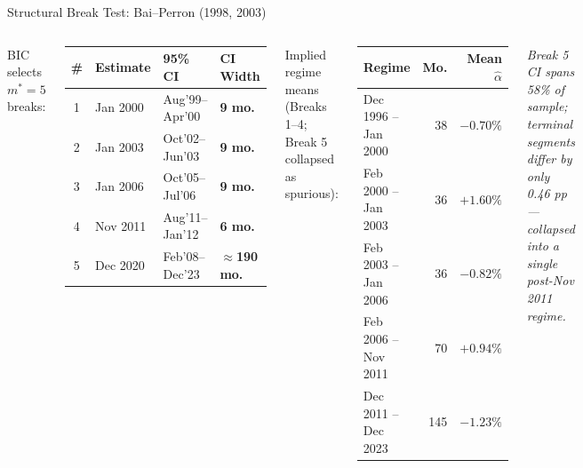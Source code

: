 \documentclass[aspectratio=169,10pt]{beamer}
\newcommand{\red}[1]{\textcolor{AlertRed}{\textbf{#1}}}
\newcommand{\green}[1]{\textcolor{SkillGreen}{\textbf{#1}}}
\begin{document}
\begin{frame}{Structural Break Test: Bai--Perron (1998, 2003)}
\begin{columns}[T]
{\scriptsize BIC selects $m^* = 5$ breaks:}
\vspace{2pt}
\begin{center}
\setlength{\tabcolsep}{3pt}
\scriptsize
\begin{tabular}{clll}
\toprule
\textbf{\#} & \textbf{Estimate} & \textbf{95\% CI} & \textbf{CI Width}\\
\midrule
1 & Jan 2000 & Aug'99–Apr'00 & \green{9 mo.} \\
2 & Jan 2003 & Oct'02–Jun'03 & \green{9 mo.} \\
3 & Jan 2006 & Oct'05–Jul'06 & \green{9 mo.} \\
4 & Nov 2011 & Aug'11–Jan'12 & \green{6 mo.} \\
5 & Dec 2020 & Feb'08–Dec'23 & \red{$\approx$190 mo.} \\
\bottomrule
\end{tabular}
\end{center}
\vspace{3pt}
{\scriptsize Implied regime means (Breaks 1--4; Break 5 collapsed as spurious):}
\vspace{2pt}
\begin{center}
\setlength{\tabcolsep}{3pt}
\scriptsize
\begin{tabular}{lrr}
\toprule
\textbf{Regime} & \textbf{Mo.} & \textbf{Mean $\hat{\alpha}$}\\
\midrule
Dec 1996 – Jan 2000 & 38 & $-0.70\%$ \\
\rowcolor{SkillGreen!10}
Feb 2000 – Jan 2003 & 36 & $+1.60\%$ \\
Feb 2003 – Jan 2006 & 36 & $-0.82\%$ \\
\rowcolor{SkillGreen!10}
Feb 2006 – Nov 2011 & 70 & $+0.94\%$ \\
\rowcolor{AlertRed!10}
Dec 2011 – Dec 2023 & 145 & $-1.23\%$ \\
\bottomrule
\end{tabular}
\end{center}
\vspace{2pt}
{\scriptsize\textit{Break 5 CI spans 58\% of sample; terminal segments differ by only 0.46 pp — collapsed into a single post-Nov 2011 regime.}}
\end{columns}
\end{frame}
\end{document}
